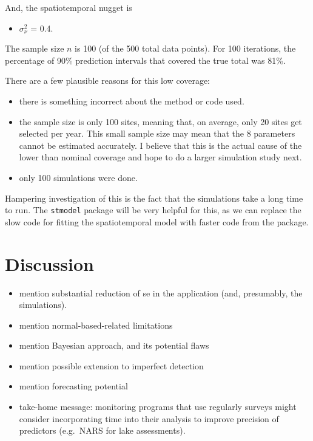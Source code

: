 \documentclass[]{interact}
\theoremstyle{plain}%
\theoremstyle{definition}
\theoremstyle{remark}
\def\tightlist{}
\begin{document}
And, the spatiotemporal nugget is

\begin{itemize}
\tightlist
\item
  \(\sigma^2_{\nu}\) = 0.4.
\end{itemize}

The sample size \(n\) is 100 (of the 500 total data points). For 100
iterations, the percentage of 90\% prediction intervals that covered the
true total was 81\%.

There are a few plausible reasons for this low coverage:

\begin{itemize}
\tightlist
\item
  there is something incorrect about the method or code used.
\item
  the sample size is only 100 sites, meaning that, on average, only 20
  sites get selected per year. This small sample size may mean that the
  8 parameters cannot be estimated accurately. I believe that this is
  the actual cause of the lower than nominal coverage and hope to do a
  larger simulation study next.
\item
  only 100 simulations were done.
\end{itemize}

Hampering investigation of this is the fact that the simulations take a
long time to run. The \texttt{stmodel} package will be very helpful for
this, as we can replace the slow code for fitting the spatiotemporal
model with faster code from the package.

\section{Discussion} \label{section:Discussion}

\begin{itemize}
\item
  mention substantial reduction of se in the application (and,
  presumably, the simulations).
\item
  mention normal-based-related limitations
\item
  mention Bayesian approach, and its potential flaws
\item
  mention possible extension to imperfect detection
\item
  mention forecasting potential
\item
  take-home message: monitoring programs that use regularly surveys
  might consider incorporating time into their analysis to improve
  precision of predictors (e.g.~NARS for lake assessments).
\end{itemize}



\end{document}

